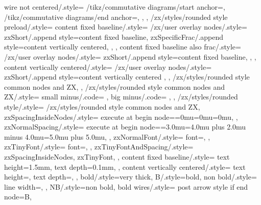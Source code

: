 {{    wire not centered/.style={
      /tikz/commutative diagrams/start anchor=,
      /tikz/commutative diagrams/end anchor=,
    },
  },
  /zx/styles/rounded style preload/.style={
    content fixed baseline/.style={
      /zx/user overlay nodes/.style={
        zxShort/.append style={content fixed baseline},
        zxSpecificFrac/.append style={content vertically centered},
      },
    },
    content fixed baseline also frac/.style={
      /zx/user overlay nodes/.style={
        zxShort/.append style={content fixed baseline},
      },
    },
    content vertically centered/.style={
      /zx/user overlay nodes/.style={
        zxShort/.append style={content vertically centered}
      },
    },
    /zx/styles/rounded style common nodes and ZX,
  },
  /zx/styles/rounded style common nodes and ZX/.style={
    small minus/.code={
      \def\zxMinus{\zxShortMinus}%
      \def\zxMinusInShort{\zxShortMinus}%
    },
    big minus/.code={
      \def\zxMinus{-}%
      \def\zxMinusInShort{-}%
    },
  },
  /zx/styles/rounded style/.style={
    /zx/styles/rounded style common nodes and ZX,
    zxSpacingInsideNodes/.style={
      execute at begin node={\thinmuskip=0mu\medmuskip=0mu\thickmuskip=0mu}, %
    },
    zxNormalSpacing/.style={
      execute at begin node={\thinmuskip=3.0mu\medmuskip=4.0mu plus 2.0mu minus 4.0mu\thickmuskip=5.0mu plus 5.0mu}, %
    },
    zxNormalFont/.style={
      font={\fontsize{10}{12}\selectfont},
    },
    zxTinyFont/.style={
      font={\fontsize{6}{6}\selectfont},
    },
    zxTinyFontAndSpacing/.style={
      zxSpacingInsideNodes,
      zxTinyFont,
    },
    content fixed baseline/.style={
      text height=1.5mm,%
      text depth=0.1mm,%
    },
    content vertically centered/.style={
      text height=,
      text depth=,
    },
    bold/.style={very thick},
    B/.style={bold},
    non bold/.style={%
      line width=\zxDefaultLineWidth,
    },
    NB/.style={non bold},
    bold wires/.style={
      post arrow style if end node={B},
}}}
